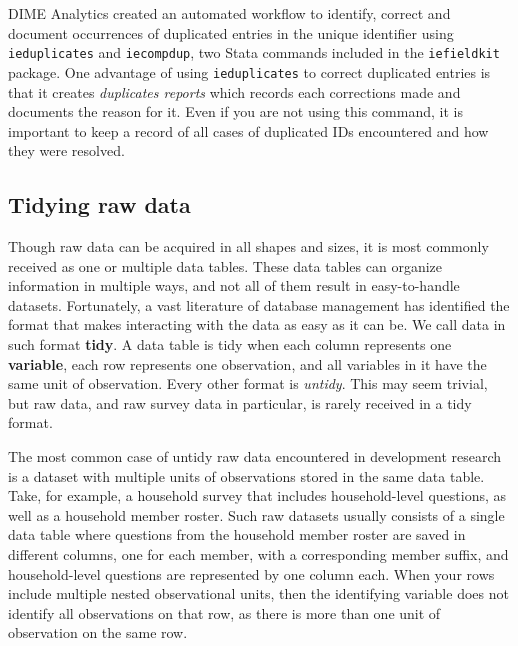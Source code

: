 DIME Analytics created an automated workflow to identify, correct and document
occurrences of duplicated entries in the unique identifier using
\texttt{ieduplicates} and \texttt{iecompdup},
two Stata commands included in the \texttt{iefieldkit}
package.
One advantage of using \texttt{ieduplicates}
to correct duplicated entries is that it creates \textit{duplicates reports}
which records each corrections made and documents the reason for it.
Even if you are not using this command,
it is important to keep a record of all cases of duplicated IDs encountered
 and how they were resolved.

\subsection{Tidying raw data}

Though raw data can be acquired in all shapes and sizes,
it is most commonly received as one or multiple data tables.
These data tables can organize information in multiple ways,
and not all of them result in easy-to-handle datasets.
Fortunately, a vast literature of database management has identified the format
that makes interacting with the data as easy as it can be.
We call data in such format \textbf{tidy}.
A data table is tidy when each column represents one \textbf{variable},
each row represents one observation,
and all variables in it have the same unit of observation.
Every other format is \textit{untidy}.
This may seem trivial, but raw data,
and raw survey data in particular,
is rarely received in a tidy format.

The most common case of untidy raw data encountered in development research
is a dataset with multiple units of observations stored in the same data table.
Take, for example, a household survey that includes household-level questions,
as well as a household member roster.
Such raw datasets usually consists of a single data table
where questions from the household member roster are saved in different columns,
one for each member, with a corresponding member suffix,
and household-level questions are represented by one column each.
When your rows include multiple nested observational units,
then the identifying variable does not identify all observations on that row,
as there is more than one unit of observation on the same row.

